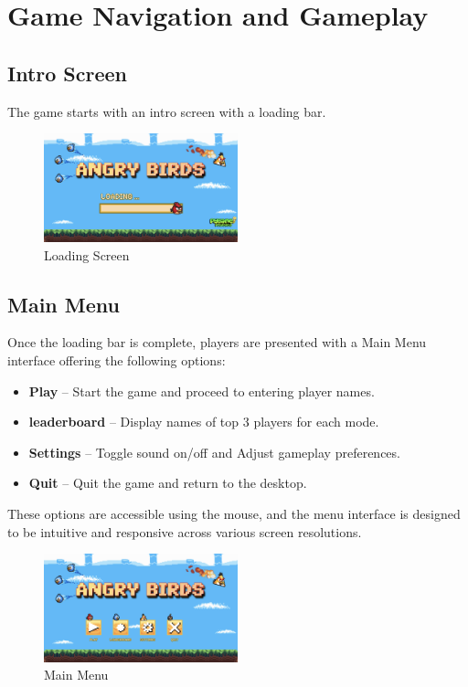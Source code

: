 \documentclass[10pt]{article}
\begin{document}
\section{Game Navigation and Gameplay}
\subsection{Intro Screen}
The game starts with an intro screen with a loading bar.

\begin{figure}[H]
    \centering
    \includegraphics[width=0.5\textwidth]{introscreen.png}
    \caption{Loading Screen}
\end{figure}

\subsection{Main Menu}
Once the loading bar is complete, players are presented with a Main Menu interface offering the following options:

\begin{itemize}
    \item \textbf{Play} – Start the game and proceed to entering player names.
    \item \textbf{leaderboard} – Display names of top 3 players for each mode.
    \item \textbf{Settings} – Toggle sound on/off and Adjust gameplay preferences.
    \item \textbf{Quit} – Quit the game and return to the desktop.
\end{itemize}

These options are accessible using the mouse, and the menu interface is designed to be intuitive and responsive across various screen resolutions.

\begin{figure}[H]
    \centering
    \includegraphics[width=0.5\textwidth]{mainmenu.png}
    \caption{Main Menu}
\end{figure}
\end{document}
